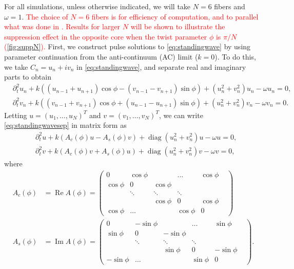 \documentclass[11pt,reqno]{amsart}
\DeclareMathOperator{\diag}{diag}
\DeclareMathOperator{\RR}{\text{Re}}
\DeclareMathOperator{\II}{\text{Im}}
\newcommand{\revised}[1]{ \textcolor{red}{#1} }
\begin{document}
For all simulations, unless otherwise indicated, we will take $N=6$ fibers and $\omega=1$. 
\revised{
The choice of $N=6$ fibers is for efficiency of computation, and to parallel what was done in \cite{castro2016,parker2021}. Results for larger $N$ will be shown to illustrate the suppression effect in the opposite core when the twist parameter $\phi$ is $\pi/N$ (\cref{fig:suppN}).
}
First, we construct pulse solutions to \cref{eq:standingwave} by using parameter continuation from the anti-continuum (AC) limit ($k=0$). To do this, we take $C_n = u_n + i v_n$ in \cref{eq:standingwave}, and separate real and imaginary parts to obtain
\begin{equation}\label{eq:standingwavesep}
\begin{aligned}
&\partial_t^2 u_n + k\left( (u_{n-1} + u_{n+1}) \cos \phi  - (v_{n-1} - v_{n+1})\sin \phi \right) + (u_n^2+v_n^2) u_n - \omega u_n= 0, \\
&\partial_t^2 v_n + k\left( (v_{n-1} + v_{n+1} ) \cos \phi + (u_{n-1}- u_{n+1})\sin \phi \right) +(u_n^2+v_n^2) v_n - \omega v_n = 0.
\end{aligned}
\end{equation}
Letting $u = (u_1, \dots, u_N)^T$ and $v = (v_1, \dots, v_N)^T$, we can write \cref{eq:standingwavesep} in matrix form as 
\begin{equation}\label{eq:standingwavematrixsep}
\begin{aligned}
&\partial_t^2 u + k (A_c(\phi) u - A_s(\phi) v) + \diag\left(u_n^2 + v_n^2 \right)u - \omega u = 0, \\
&\partial_t^2 v + k (A_c(\phi) v + A_s(\phi) u) + \diag\left(u_n^2 + v_n^2 \right)v - \omega v = 0,
\end{aligned}
\end{equation}
where
\begin{align}
A_c(\phi) &= \RR A(\phi) = \begin{pmatrix}
0 & \cos \phi & & \dots & \cos \phi \\
\cos \phi & 0 & \cos \phi & & & \\
& \ddots & \ddots & \ddots &  & \\
 & &\cos \phi  & 0 & \cos \phi  \\
\cos \phi& \dots & & \cos \phi & 0
\end{pmatrix} \label{eq:realA} \\ 
A_s(\phi) &= \II A(\phi) = \begin{pmatrix}
0 & -\sin \phi & & \dots & \sin \phi \\
\sin \phi & 0 & -\sin \phi & & & \\
& \ddots & \ddots & \ddots &  & \\
 & &\sin \phi  & 0 & -\sin \phi  \\
-\sin \phi& \dots & & \sin \phi & 0
\end{pmatrix}.\label{eq:imagA}
\end{align}
\end{document}
